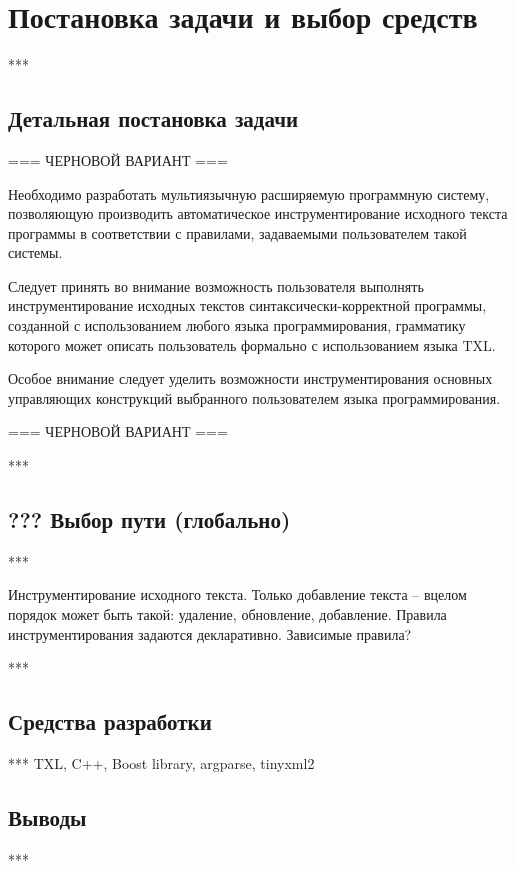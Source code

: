 \chapter{Постановка задачи и выбор средств}

***

\section{Детальная постановка задачи}

=== ЧЕРНОВОЙ ВАРИАНТ ===

Необходимо разработать мультиязычную расширяемую программную систему, позволяющую производить автоматическое инструментирование исходного текста программы в соответствии с правилами, задаваемыми пользователем такой системы.

Следует принять во внимание возможность пользователя выполнять инструментирование исходных текстов синтаксически-корректной программы, созданной с использованием любого языка программирования, грамматику которого может описать пользователь формально с использованием языка TXL.

Особое внимание следует уделить возможности инструментирования основных управляющих конструкций выбранного пользователем языка программирования.

=== ЧЕРНОВОЙ ВАРИАНТ ===

***

\section{??? Выбор пути (глобально)}

***

Инструментирование исходного текста.
Только добавление текста -- вцелом порядок может быть такой: удаление, обновление, добавление.
Правила инструментирования задаются декларативно.
Зависимые правила?

***

\section{Средства разработки}

***
TXL, C++, Boost library, argparse, tinyxml2

\section{Выводы}

***
